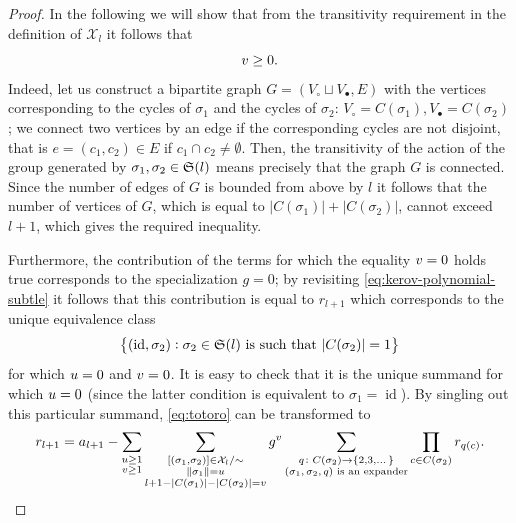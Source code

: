 \documentclass[12pt,usenames,dvipsnames,svgnames,table]{amsart}
\begin{document}
\begin{proof}
	In the following we will show that 
	from the transitivity requirement in the definition of $\mathcal{X}_l$ it follows that 
	\[ v\geq 0. \]
	Indeed, let us construct a bipartite graph $G = (V_\circ \sqcup
	V_\bullet,E)$ with the vertices corresponding to the cycles of
	$\sigma_1$ and the cycles of $\sigma_2$: $V_\circ =
	C(\sigma_1), V_\bullet = C(\sigma_2)$; we connect two vertices 
	by an edge if the corresponding cycles are not disjoint, 
	that is $e = (c_1,c_2)\in E$ if $c_1 \cap c_2 \neq \emptyset$. Then, the
	transitivity of the action of the group generated by $\sigma_1,\sigma_2\in\mathfrak{S}(l)$ 
	means precisely that
	the graph $G$ is connected. Since the number of edges of $G$ is bounded from above
	by $l$ it follows that the number of vertices of $G$, which is equal to
	$|C(\sigma_1)|+|C(\sigma_2)|$, cannot exceed $l+1$, which gives the required inequality.
	
	Furthermore, the contribution of the terms for which the equality $v=0$ holds true
	corresponds to the specialization $g=0$;
	by revisiting \eqref{eq:kerov-polynomial-subtle} it follows that
	this contribution is equal to $r_{l+1}$ which corresponds to
	the unique equivalence class 
	\[ \big\{ (\operatorname{id},\sigma_2) : 
	\sigma_2\in\mathfrak{S}(l) \text{ is such that $|C(\sigma_2)|=1$} \big\}
	\]
	for which $u=0$ and $v=0$. It is easy to check that it is the unique
	summand for which $u=0$ (since the latter condition is equivalent to
	$\sigma_1=\operatorname{id}$). 
	By singling out this particular summand,
	\eqref{eq:totoro} can be transformed to
	\begin{equation}
	\label{eq:induction-step}
	r_{l+1} = a_{l+1} -
	\sum_{\substack{u\geq 1 \\ v\geq 1}}
	\sum_{\substack{[(\sigma_1,\sigma_2)]\in\mathcal{X}_l/\sim \\ \|\sigma_1\|=u \\ 
			l+1-|C(\sigma_1)|-|C(\sigma_2)|=v}} 
	g^{v} 
	\sum_{\substack{q\colon C(\sigma_2)\to\{2,3,\dots\} \\
			\text{$(\sigma_1,\sigma_2,q)$ is an expander}}}
	\prod_{c\in C(\sigma_2)} r_{q(c)}.
	\end{equation}
	

\end{proof}
\end{document}
